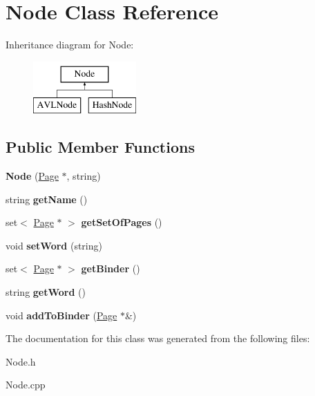 \hypertarget{class_node}{\section{Node Class Reference}
\label{class_node}
}
Inheritance diagram for Node\+:\begin{figure}[H]
\begin{center}
\leavevmode
\includegraphics[height=2.000000cm]{class_node}
\end{center}
\end{figure}
\subsection*{Public Member Functions}
\begin{DoxyCompactItemize}
\item 
\hypertarget{class_node_a521cc0c4ebb153869947b76df9e0eada}{{\bfseries Node} (\hyperlink{class_page}{Page} $\ast$, string)}\label{class_node_a521cc0c4ebb153869947b76df9e0eada}

\item 
\hypertarget{class_node_ac5298373555f67634e27e5c739e7c94b}{string {\bfseries get\+Name} ()}\label{class_node_ac5298373555f67634e27e5c739e7c94b}

\item 
\hypertarget{class_node_a1fa90b3fa1a6ad3bbe616c4a6c0ba831}{set$<$ \hyperlink{class_page}{Page} $\ast$ $>$ {\bfseries get\+Set\+Of\+Pages} ()}\label{class_node_a1fa90b3fa1a6ad3bbe616c4a6c0ba831}

\item 
\hypertarget{class_node_ac6ab8994f203f84c076602540f003f7c}{void {\bfseries set\+Word} (string)}\label{class_node_ac6ab8994f203f84c076602540f003f7c}

\item 
\hypertarget{class_node_a742fe1af9dc4e51b0153a430bf2761bf}{set$<$ \hyperlink{class_page}{Page} $\ast$ $>$ {\bfseries get\+Binder} ()}\label{class_node_a742fe1af9dc4e51b0153a430bf2761bf}

\item 
\hypertarget{class_node_a921c6be0a1bb9c49ecaecaf675cd7260}{string {\bfseries get\+Word} ()}\label{class_node_a921c6be0a1bb9c49ecaecaf675cd7260}

\item 
\hypertarget{class_node_a2e469c97259b2823f9d9611da3ae2184}{void {\bfseries add\+To\+Binder} (\hyperlink{class_page}{Page} $\ast$\&)}\label{class_node_a2e469c97259b2823f9d9611da3ae2184}

\end{DoxyCompactItemize}


The documentation for this class was generated from the following files\+:\begin{DoxyCompactItemize}
\item 
Node.\+h\item 
Node.\+cpp\end{DoxyCompactItemize}
